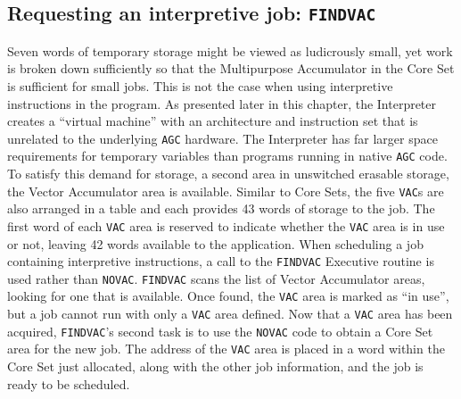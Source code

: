 \documentclass[refcap, oxford]{ahsan}
\begin{document}
\subsection{Requesting an interpretive job: \texttt{FINDVAC}}

Seven words of temporary storage might be viewed as ludicrously small, yet work is broken down sufficiently so that the Multipurpose Accumulator in the Core Set is sufficient for small jobs. This is not the case when using interpretive instructions in the program. As presented later in this chapter, the Interpreter creates a ``virtual machine'' with an architecture and instruction set that is unrelated to the underlying \texttt{AGC} hardware. The Interpreter has far larger space requirements for temporary variables than programs running in native \texttt{AGC} code. To satisfy this demand for storage, a second area in unswitched erasable storage, the Vector Accumulator area is available. Similar to Core Sets, the five \texttt{VAC}s are also arranged in a table and each provides 43 words of storage to the job. The first word of each \texttt{VAC} area is reserved to indicate whether the \texttt{VAC} area is in use or not, leaving 42 words available to the application. When scheduling a job containing interpretive instructions, a call to the \texttt{FINDVAC} Executive routine is used rather than \texttt{NOVAC}. \texttt{FINDVAC} scans the list of Vector Accumulator areas, looking for one that is available. Once found, the \texttt{VAC} area is marked as ``in use'', but a job cannot run with only a \texttt{VAC} area defined. Now that a \texttt{VAC} area has been acquired, \texttt{FINDVAC}'s second task is to use the \texttt{NOVAC} code to obtain a Core Set area for the new job. The address of the \texttt{VAC} area is placed in a word within the Core Set just allocated, along with the other job information, and the job is ready to be scheduled.
\end{document}
